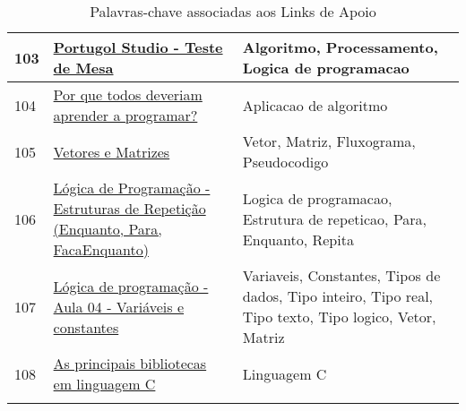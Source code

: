 \begin{longtable}{| p{} | p{} | p{} |}
103 & \href{https://www.youtube.com/watch?v=Lelg\_sOYSm0}{\color{blue} Portugol Studio - Teste de Mesa                                                     } & Algoritmo, Processamento, Logica de programacao                                                                                                   \\ \hline
104 & \href{https://www.youtube.com/watch?v=mHW1Hsqlp6A}{\color{blue} Por que todos deveriam aprender a programar?                                        } & Aplicacao de algoritmo                                                                                                                            \\ \hline
105 & \href{https://www.youtube.com/watch?v=UuTmEcy5rV0}{\color{blue} Vetores e Matrizes                                                                  } & Vetor, Matriz, Fluxograma, Pseudocodigo                                                                                                           \\ \hline
106 & \href{https://www.youtube.com/watch?v=vgu8x\_Ivjd0}{\color{blue} Lógica de Programação - Estruturas de Repetição (Enquanto, Para, FacaEnquanto)      } & Logica de programacao, Estrutura de repeticao, Para, Enquanto, Repita                                                                             \\ \hline
107 & \href{https://www.youtube.com/watch?v=vp4jgXA\_BB0}{\color{blue} Lógica de programação - Aula 04 - Variáveis e constantes                            } & Variaveis, Constantes, Tipos de dados, Tipo inteiro, Tipo real, Tipo texto, Tipo logico, Vetor, Matriz                                            \\ \hline
108 & \href{https://www.zemoleza.com.br/trabalho-academico/exatas/informatica/as-principais-bibliotecas-em-linguagem-c/}{\color{blue} As principais bibliotecas em linguagem C                                            } & Linguagem C \\ \hline
\caption{Palavras-chave associadas aos Links de Apoio}
\label{tab:palavras-chave-links-de-apoio}
\end{longtable}
